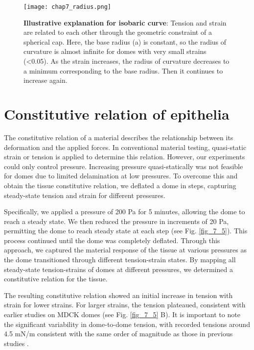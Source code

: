 \begin{figure}
	\centering
	\texttt{[image: chap7\_radius.png]}
	\caption{\label{fig_7_4} \textbf{Illustrative explanation for isobaric curve}: Tension and strain are related to each other through the geometric constraint of a spherical cap. Here, the base radius (a) is constant, so the radius of curvature is almost infinite for domes with very small strains (<0.05). As the strain increases, the radius of curvature decreases to a minimum corresponding to the base radius. Then it continues to increase again.	
	}
\end{figure}

\hypertarget{constitutive-relation-of-epithelia}{%
	\section{Constitutive relation of
		epithelia}\label{constitutive-relation-of-epithelia}}

The constitutive relation of a material describes the relationship between its deformation and the applied forces. In conventional material testing, quasi-static strain or tension is applied to determine this relation. However, our experiments could only control pressure. Increasing pressure quasi-statically was not feasible for domes due to limited delamination at low pressures. To overcome this and obtain the tissue constitutive relation, we deflated a dome in steps, capturing steady-state tension and strain for different pressures.

Specifically, we applied a pressure of 200 \unit{\pascal} for 5 minutes, allowing the dome to reach a steady state. We then reduced the pressure in increments of 20 \unit{\pascal}, permitting the dome to reach steady state at each step (see Fig. \ref{fig_7_5}). This process continued until the dome was completely deflated. Through this approach, we captured the material response of the tissue at various pressures as the dome transitioned through different tension-strain states. By mapping all steady-state tension-strains of domes at different pressures, we determined a constitutive relation for the tissue.

The resulting constitutive relation showed an initial increase in tension with strain for lower strains. For larger strains, the tension plateaued, consistent with earlier studies on MDCK domes (see Fig. \ref{fig_7_5} B). It is important to note the significant variability in dome-to-dome tension, with recorded tensions around 4.5 \unit{mN/m} consistent with the same order of magnitude as those in previous studies \cite{latorre2018,marin-llaurado2022}.

